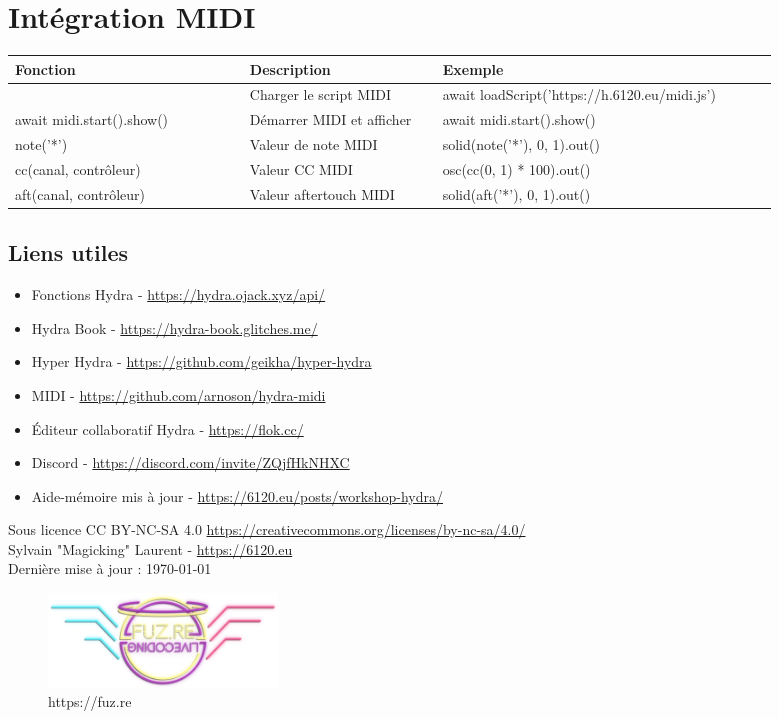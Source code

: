 \documentclass[9pt,oneside]{amsart}
\begin{document}
\section*{Intégration MIDI}
\begin{tabular}{L{0.28\linewidth}L{0.23\linewidth}L{0.40\linewidth}}
\toprule
\textbf{Fonction} & \textbf{Description} & \textbf{Exemple} \\
\midrule
 & Charger le script MIDI & await loadScript('https://h.6120.eu/midi.js') \\
await midi.start().show() & Démarrer MIDI et afficher & await midi.start().show() \\
note('*') & Valeur de note MIDI & solid(note('*'), 0, 1).out() \\
cc(canal, contrôleur) & Valeur CC MIDI & osc(cc(0, 1) * 100).out() \\
aft(canal, contrôleur) & Valeur aftertouch MIDI & solid(aft('*'), 0, 1).out() \\
\bottomrule
\end{tabular}

\subsection*{Liens utiles}
\begin{itemize}
\item Fonctions Hydra - \url{https://hydra.ojack.xyz/api/}
\item Hydra Book - \url{https://hydra-book.glitches.me/}
\item Hyper Hydra - \url{https://github.com/geikha/hyper-hydra}
\item MIDI - \url{https://github.com/arnoson/hydra-midi}
\item Éditeur collaboratif Hydra - \url{https://flok.cc/}
\item Discord - \url{https://discord.com/invite/ZQjfHkNHXC}
\item Aide-mémoire mis à jour - \url{https://6120.eu/posts/workshop-hydra/}
\end{itemize}
\vspace{2cm}
Sous licence CC BY-NC-SA 4.0 \url{https://creativecommons.org/licenses/by-nc-sa/4.0/} \\
Sylvain "Magicking" Laurent - \url{https://6120.eu} \\
Dernière mise à jour : \today\\

\begin{figure}
    \includegraphics[height=25mm]{fuzrelivecoding.png}
    \caption{https://fuz.re}
    \label{fig:wrapfig}
    \end{figure}
\end{document}
